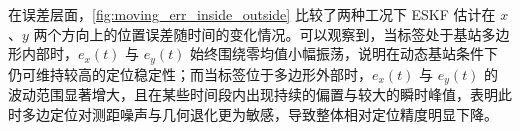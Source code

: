 





在误差层面，\autoref{fig:moving_err_inside_outside} 比较了两种工况下 ESKF 估计在 $x$、$y$ 两个方向上的位置误差随时间的变化情况。可以观察到，当标签处于基站多边形内部时，$e_x(t)$ 与 $e_y(t)$ 始终围绕零均值小幅振荡，说明在动态基站条件下仍可维持较高的定位稳定性；而当标签位于多边形外部时，$e_x(t)$ 与 $e_y(t)$ 的波动范围显著增大，且在某些时间段内出现持续的偏置与较大的瞬时峰值，表明此时多边定位对测距噪声与几何退化更为敏感，导致整体相对定位精度明显下降。

